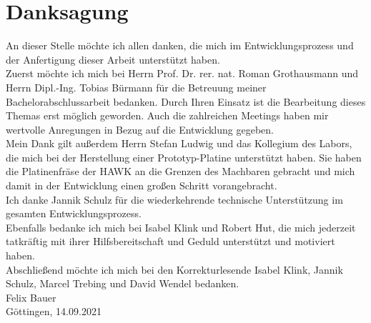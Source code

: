 \newpage
\section*{Danksagung}
An dieser Stelle möchte ich allen danken, die mich im Entwicklungsprozess und der Anfertigung dieser Arbeit unterstützt haben.\\
\newline
Zuerst möchte ich mich bei Herrn Prof. Dr. rer. nat. Roman Grothausmann und Herrn Dipl.-Ing. Tobias Bürmann für die Betreuung meiner Bachelorabschlussarbeit bedanken. Durch Ihren Einsatz ist die Bearbeitung dieses Themas erst möglich geworden. Auch die zahlreichen Meetings haben mir wertvolle Anregungen in Bezug auf die Entwicklung gegeben.\\
\newline
Mein Dank gilt außerdem Herrn Stefan Ludwig und das Kollegium des Labors, die mich bei der Herstellung einer Prototyp-Platine unterstützt haben. Sie haben die Platinenfräse der HAWK an die Grenzen des Machbaren gebracht und mich damit in der Entwicklung einen großen Schritt vorangebracht.\\
\newline
Ich danke Jannik Schulz für die wiederkehrende technische Unterstützung im gesamten Entwicklungsprozess.\\
\newline
Ebenfalls bedanke ich mich bei Isabel Klink und Robert Hut, die mich jederzeit tatkräftig mit ihrer Hilfsbereitschaft und Geduld unterstützt und motiviert haben.\\
\newline
Abschließend möchte ich mich bei den Korrekturlesende Isabel Klink, Jannik Schulz, Marcel Trebing und David Wendel bedanken.\\
\newline
Felix Bauer\\
\newline
\newline
\newline
Göttingen, 14.09.2021